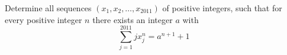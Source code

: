 Determine all sequences 
$(x_1,x_2,\ldots,x_{2011})$
 of positive integers, such that for every positive integer 
$n$
 there exists an integer 
$a$
 with 
\[\sum^{2011}_{j=1} j  x^n_j = a^{n+1} + 1\]
